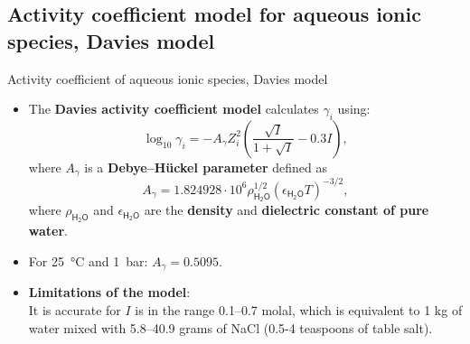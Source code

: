 \subsection{Activity coefficient model for aqueous ionic species, Davies model}
%
%
\begin{frame}{Activity coefficient of aqueous ionic species, Davies model}
\begin{itemize}[<+->]
\item The \alert{\textbf{Davies activity coefficient model} }calculates $\gamma_{i}$
using:
\[
\boxed{\log_{10}\gamma_{i}=-A_{\gamma}Z_{i}^{2}\left(\dfrac{\sqrt{I}}{1+\sqrt{I}}-0.3I\right)},
\]
where $A_{\gamma}$ is a \textbf{Debye–Hückel parameter} defined as
\[
A_{\gamma}=1.824928\cdot10^{6}\rho_{\mathsf{H_{2}O}}^{1/2}(\epsilon_{\mathsf{H_{2}O}}T)^{-3/2},
\]
%
where $\rho_{\mathsf{H_{2}O}}$ and $\epsilon_{\mathsf{H_{2}O}}$
are the \textbf{density} and \textbf{dielectric constant of pure water}. 
\item For 25~°C and 1~bar: $A_{\gamma}=0.5095$.
\item \textbf{Limitations of the model}: \\
It is accurate for $I$ is in the range 0.1–0.7 molal, which is equivalent to 1 kg of water mixed with 5.8–40.9 grams of NaCl (0.5-4 teaspoons of table salt).
\end{itemize}
\end{frame}
%
%

